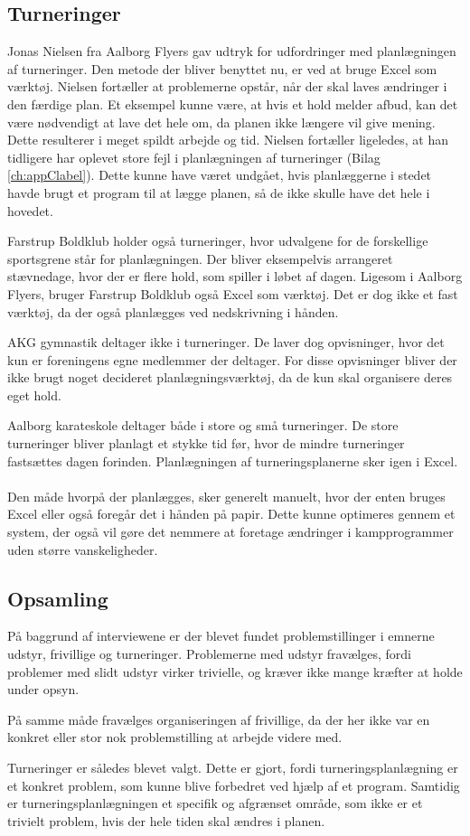 \subsection*{Turneringer}
Jonas Nielsen fra Aalborg Flyers gav udtryk for udfordringer med planlægningen af turneringer. Den metode der bliver benyttet nu, er ved at bruge Excel som værktøj. Nielsen fortæller at problemerne opstår, når der skal laves ændringer i den færdige plan. Et eksempel kunne være, at hvis et hold melder afbud, kan det være nødvendigt at lave det hele om, da planen ikke længere vil give mening. Dette resulterer i meget spildt arbejde og tid. Nielsen fortæller ligeledes, at han tidligere har oplevet store fejl i planlægningen af turneringer (Bilag \ref{ch:appClabel}). Dette kunne have været undgået, hvis planlæggerne i stedet havde brugt et program til at lægge planen, så de ikke skulle have det hele i hovedet.
\par
Farstrup Boldklub holder også turneringer, hvor udvalgene for de forskellige sportsgrene står for planlægningen. Der bliver eksempelvis arrangeret stævnedage, hvor der er flere hold, som spiller i løbet af dagen. Ligesom i Aalborg Flyers, bruger Farstrup Boldklub også Excel som værktøj. Det er dog ikke et fast værktøj, da der også planlægges ved nedskrivning i hånden.
\par
AKG gymnastik deltager ikke i turneringer. De laver dog opvisninger, hvor det kun er foreningens egne medlemmer der deltager. For disse opvisninger bliver der ikke brugt noget decideret planlægningsværktøj, da de kun skal organisere deres eget hold. %
\par
Aalborg karateskole deltager både i store og små turneringer. De store turneringer bliver planlagt et stykke tid før, hvor de mindre turneringer fastsættes dagen forinden. Planlægningen af turneringsplanerne sker igen i Excel. 
\\\\
Den måde hvorpå der planlægges, sker generelt manuelt, hvor der enten bruges Excel eller også foregår det i hånden på papir. Dette kunne optimeres gennem et system, der også vil gøre det nemmere at foretage ændringer i kampprogrammer uden større vanskeligheder.

\subsection*{Opsamling}
På baggrund af interviewene er der blevet fundet problemstillinger i emnerne udstyr, frivillige og turneringer. Problemerne med udstyr fravælges, fordi problemer med slidt udstyr virker trivielle, og kræver ikke mange kræfter at holde under opsyn.
\par
På samme måde fravælges organiseringen af frivillige, da der her ikke var en konkret eller stor nok problemstilling at arbejde videre med.
\par
Turneringer er således blevet valgt. Dette er gjort, fordi turneringsplanlægning er et konkret problem, som kunne blive forbedret ved hjælp af et program. Samtidig er turneringsplanlægningen et specifik og afgrænset område, som ikke er et trivielt problem, hvis der hele tiden skal ændres i planen.

